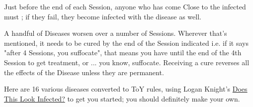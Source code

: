 \newpage


Just before the end of each Session, anyone who has come Close to the infected must \RSTRY{\VIG}; if they fail, they become infected with the disease as well.

A handful of Diseases worsen over a number of Sessions.  Wherever that's mentioned, it needs to be cured by the end of the Session indicated i.e.  if it says "after 4 Sessions, you suffocate", that means you have until the end of the 4th Session to get treatment, or ... you know, suffocate.  Receiving a cure reverses all the effects of the Disease unless they are permanent.

Here are 16 various diseases converted to ToY rules, using Logan Knight's \href{https://www.lastgaspgrimoire.com/does-this-look-infected/}{Does This Look Infected?} to get you started; you should definitely make your own.


